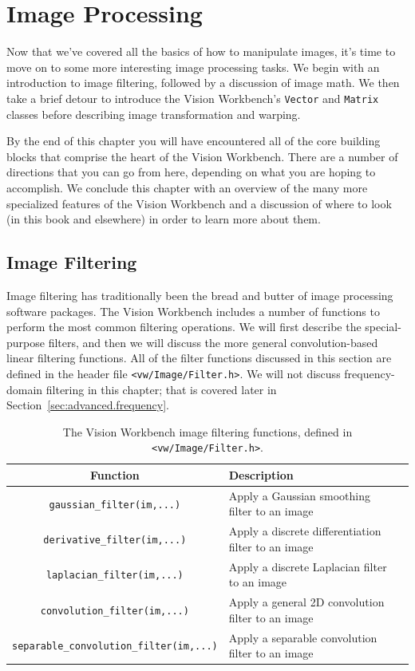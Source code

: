 \chapter{Image Processing}\label{ch:imageprocessing}

Now that we've covered all the basics of how to manipulate images, 
it's time to move on to some more interesting image processing 
tasks.  We begin with an introduction to image filtering, followed 
by a discussion of image math.  We then take a brief detour to 
introduce the Vision Workbench's \verb#Vector# and \verb#Matrix# 
classes before describing image transformation and warping.

By the end of this chapter you will have encountered all of the core
building blocks that comprise the heart of the Vision Workbench.
There are a number of directions that you can go from here, depending
on what you are hoping to accomplish.  We conclude this chapter with
an overview of the many more specialized features of the Vision
Workbench and a discussion of where to look (in this book and
elsewhere) in order to learn more about them.

\section{Image Filtering}

Image filtering has traditionally been the bread and butter of image
processing software packages.  The Vision Workbench includes a number
of functions to perform the most common filtering operations.  We will
first describe the special-purpose filters, and then we will discuss
the more general convolution-based linear filtering functions.  All of
the filter functions discussed in this section are defined in the
header file \verb#<vw/Image/Filter.h>#.  We will not discuss
frequency-domain filtering in this chapter; that is covered later in
Section~\ref{sec:advanced.frequency}.

\begin{table}[t]\begin{centering}
\begin{tabular}{|c|l|l|} \hline
Function & Description \\ \hline \hline
\verb#gaussian_filter(im,...)# & Apply a Gaussian smoothing filter to an image \\ \hline
\verb#derivative_filter(im,...)# & Apply a discrete differentiation filter to an image \\ \hline
\verb#laplacian_filter(im,...)# & Apply a discrete Laplacian filter to an image \\ \hline
\verb#convolution_filter(im,...)# & Apply a general 2D convolution filter to an image \\ \hline
\verb#separable_convolution_filter(im,...)# & Apply a separable convolution filter to an image \\ \hline
\end{tabular}
\caption{The Vision Workbench image filtering functions, defined in {\tt <vw/Image/Filter.h>}.}
\label{tbl:image-filters}
\end{centering}\end{table}


